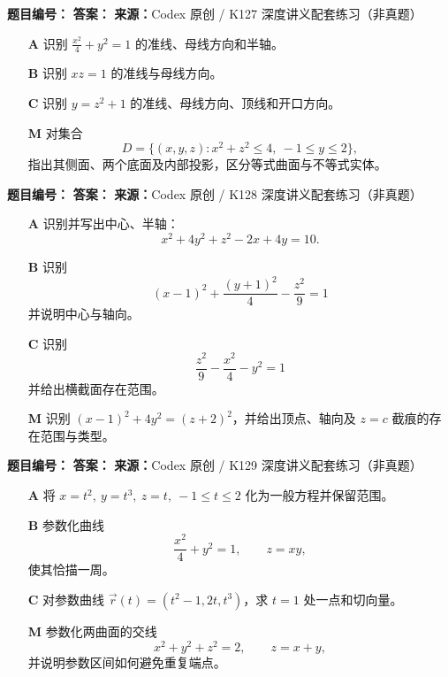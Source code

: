 \begin{problemBox}
\begin{problemMeta}
\textbf{题目编号：} \quad
\textbf{答案：} \quad
\textbf{来源：}Codex 原创 / K127 深度讲义配套练习（非真题）
\end{problemMeta}
\begin{enumerate}
  \item[\textbf{A}] 识别
  \(\frac{x^2}{4}+y^2=1\) 的准线、母线方向和半轴。
  \item[\textbf{B}] 识别 \(xz=1\) 的准线与母线方向。
  \item[\textbf{C}] 识别 \(y=z^2+1\) 的准线、母线方向、顶线和开口方向。
  \item[\textbf{M}] 对集合
  \[
  D=\{(x,y,z):x^2+z^2\le4,\ -1\le y\le2\},
  \]
  指出其侧面、两个底面及内部投影，区分等式曲面与不等式实体。
\end{enumerate}
\end{problemBox}

\begin{problemBox}
\begin{problemMeta}
\textbf{题目编号：} \quad
\textbf{答案：} \quad
\textbf{来源：}Codex 原创 / K128 深度讲义配套练习（非真题）
\end{problemMeta}
\begin{enumerate}
  \item[\textbf{A}] 识别并写出中心、半轴：
  \[
  x^2+4y^2+z^2-2x+4y=10.
  \]
  \item[\textbf{B}] 识别
  \[
  (x-1)^2+\frac{(y+1)^2}{4}-\frac{z^2}{9}=1
  \]
  并说明中心与轴向。
  \item[\textbf{C}] 识别
  \[
  \frac{z^2}{9}-\frac{x^2}{4}-y^2=1
  \]
  并给出横截面存在范围。
  \item[\textbf{M}] 识别
  \((x-1)^2+4y^2=(z+2)^2\)，并给出顶点、轴向及
  \(z=c\) 截痕的存在范围与类型。
\end{enumerate}
\end{problemBox}

\begin{problemBox}
\begin{problemMeta}
\textbf{题目编号：} \quad
\textbf{答案：} \quad
\textbf{来源：}Codex 原创 / K129 深度讲义配套练习（非真题）
\end{problemMeta}
\begin{enumerate}
  \item[\textbf{A}] 将
  \(x=t^2,\ y=t^3,\ z=t,\ -1\le t\le2\)
  化为一般方程并保留范围。
  \item[\textbf{B}] 参数化曲线
  \[
  \frac{x^2}{4}+y^2=1,\qquad z=xy,
  \]
  使其恰描一周。
  \item[\textbf{C}] 对参数曲线
  \(\vec r(t)=(t^2-1,2t,t^3)\)，求 \(t=1\) 处一点和切向量。
  \item[\textbf{M}] 参数化两曲面的交线
  \[
  x^2+y^2+z^2=2,\qquad z=x+y,
  \]
  并说明参数区间如何避免重复端点。
\end{enumerate}
\end{problemBox}

